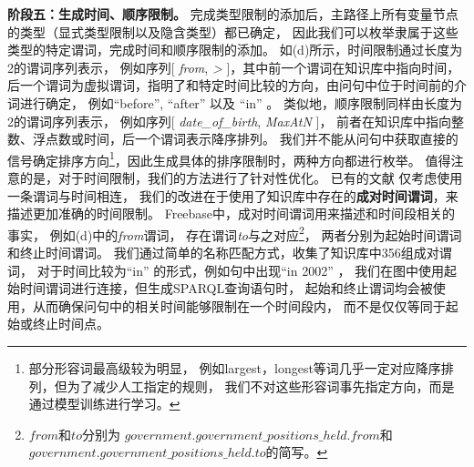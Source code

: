\textbf{阶段五：生成时间、顺序限制。}
完成类型限制的添加后，主路径上所有变量节点的类型（显式类型限制以及隐含类型）都已确定，
因此我们可以枚举隶属于这些类型的特定谓词，完成时间和顺序限制的添加。
如(d)所示，时间限制通过长度为2的谓词序列表示，
例如序列[ \textit{from}, \textit{>} ]，其中前一个谓词在知识库中指向时间，
后一个谓词为虚拟谓词，指明了和特定时间比较的方向，由问句中位于时间前的介词进行确定，
例如``before'', ``after'' 以及 ``in'' 。
类似地，顺序限制同样由长度为2的谓词序列表示，
例如序列[ \textit{date\_of\_birth}, \textit{MaxAtN} ]，
前者在知识库中指向整数、浮点数或时间，后一个谓词表示降序排列。
我们并不能从问句中获取直接的信号确定排序方向\footnote{部分形容词最高级较为明显，
例如largest，longest等词几乎一定对应降序排列，但为了减少人工指定的规则，
我们不对这些形容词事先指定方向，而是通过模型训练进行学习。
}，因此生成具体的排序限制时，两种方向都进行枚举。
值得注意的是，对于时间限制，我们的方法进行了针对性优化。
已有的文献\parencite{yih2015semantic,bao2016constraint}
仅考虑使用一条谓词与时间相连，
我们的改进在于使用了知识库中存在的\textbf{成对时间谓词}，来描述更加准确的时间限制。
Freebase中，成对时间谓词用来描述和时间段相关的事实，
例如(d)中的\textit{from}谓词，
存在谓词\textit{to}与之对应\footnote{$from$和$to$分别为
$government.government\_positions\_held.from$和
$government.government\_positions\_held.to$的简写。}，
两者分别为起始时间谓词和终止时间谓词。
我们通过简单的名称匹配方式，收集了知识库中356组成对谓词，
对于时间比较为``in'' 的形式，例如句中出现``in 2002'' ，
我们在图中使用起始时间谓词进行连接，但生成SPARQL查询语句时，
起始和终止谓词均会被使用，从而确保问句中的相关时间能够限制在一个时间段内，
而不是仅仅等同于起始或终止时间点。

% 


